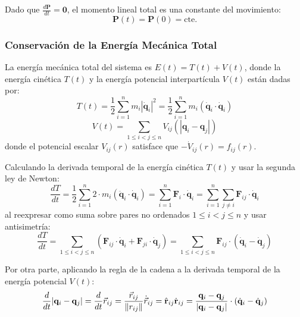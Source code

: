 \documentclass[11pt, a4paper]{article}
\begin{document}
	Dado que $\frac{d\mathbf{P}}{dt} = \mathbf{0}$, el momento lineal total es una constante del movimiento:
	\begin{equation}
		\mathbf{P}(t) = \mathbf{P}(0) = \text{cte.}
	\end{equation}
	
	\subsubsection{Conservación de la Energía Mecánica Total}
	
	La energía mecánica total del sistema es $E(t) = T(t) + V(t)$, donde la energía cinética $T(t)$ y la energía potencial interpartícula $V(t)$ están dadas por:
	\begin{equation}
		T(t) = \frac{1}{2} \sum_{i=1}^n m_i |\dot{\mathbf{q}}_i|^2 = \frac{1}{2} \sum_{i=1}^n m_i (\dot{\mathbf{q}}_i \cdot \dot{\mathbf{q}}_i)
	\end{equation}
	\begin{equation}
		V(t) = \sum_{1 \le i < j \le n} V_{ij}(|\mathbf{q}_i - \mathbf{q}_j|)
	\end{equation}
	donde el potencial escalar $V_{ij}(r)$ satisface que $-\dot{V}_{ij}(r) = f_{ij}(r)$.
	
	Calculando la derivada temporal de la energía cinética $T(t)$ y usar la segunda ley de Newton:
	\begin{equation}
		\frac{dT}{dt} = \frac{1}{2} \sum_{i=1}^n 2 \cdot m_i (\ddot{\mathbf{q}}_i \cdot \dot{\mathbf{q}}_i) = \sum_{i=1}^n \mathbf{F}_i \cdot \dot{\mathbf{q}}_i = \sum_{i=1}^n \sum_{j \neq i} \mathbf{F}_{ij} \cdot \dot{\mathbf{q}}_i
	\end{equation}
	al reexpresar como suma sobre pares no ordenados $1 \le i < j \le n$ y usar antisimetría:
	\begin{equation}
		\frac{dT}{dt} = \sum_{1 \le i < j \le n} (\mathbf{F}_{ij} \cdot \dot{\mathbf{q}}_i + \mathbf{F}_{ji} \cdot \dot{\mathbf{q}}_j) = \sum_{1 \le i < j \le n} \mathbf{F}_{ij} \cdot (\dot{\mathbf{q}}_i - \dot{\mathbf{q}}_j)
		\label{eq:dT_dt}
	\end{equation}
	
	Por otra parte, aplicando la regla de la cadena a la derivada temporal de la energía potencial $V(t)$:
	\begin{equation}
		\frac{d}{dt} |\mathbf{q}_i - \mathbf{q}_j| = \frac{d}{dt} \vec{r}_{ij} = \frac{\vec{r}_{ij}}{\norm{r_{ij}}} \dot{\vec{r}}_{ij} = \hat{\mathbf{r}}_{ij} \dot{\mathbf{r}}_{ij} = \frac{\mathbf{q}_i - \mathbf{q}_j}{|\mathbf{q}_i - \mathbf{q}_j|} \cdot (\dot{\mathbf{q}}_i - \dot{\mathbf{q}}_j)
	\end{equation}
	
\end{document}
